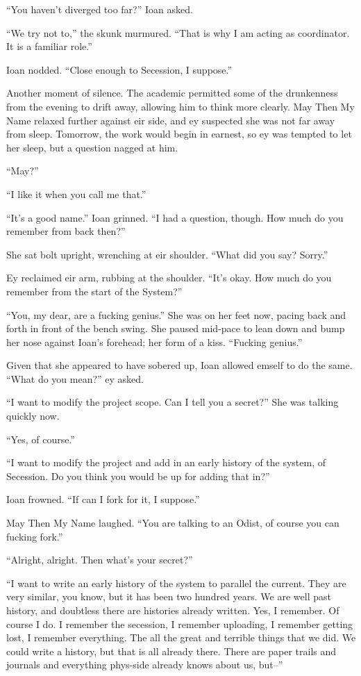 ``You haven't diverged too far?'' Ioan asked.

``We try not to,'' the skunk murmured. ``That is why I am acting as coordinator. It is a familiar role.''

Ioan nodded. ``Close enough to Secession, I suppose.''

Another moment of silence. The academic permitted some of the drunkenness from the evening to drift away, allowing him to think more clearly. May Then My Name relaxed further against eir side, and ey suspected she was not far away from sleep. Tomorrow, the work would begin in earnest, so ey was tempted to let her sleep, but a question nagged at him.

``May?''

``I like it when you call me that.''

``It's a good name.'' Ioan grinned. ``I had a question, though. How much do you remember from back then?''

She sat bolt upright, wrenching at eir shoulder. ``What did you say? Sorry.''

Ey reclaimed eir arm, rubbing at the shoulder. ``It's okay. How much do you remember from the start of the System?''

``You, my dear, are a fucking genius.'' She was on her feet now, pacing back and forth in front of the bench swing. She paused mid-pace to lean down and bump her nose against Ioan's forehead; her form of a kiss. ``Fucking genius.''

Given that she appeared to have sobered up, Ioan allowed emself to do the same. ``What do you mean?'' ey asked.

``I want to modify the project scope. Can I tell you a secret?'' She was talking quickly now.

``Yes, of course.''

``I want to modify the project and add in an early history of the system, of Secession. Do you think you would be up for adding that in?''

Ioan frowned. ``If can I fork for it, I suppose.''

May Then My Name laughed. ``You are talking to an Odist, of course you can fucking fork.''

``Alright, alright. Then what's your secret?''

``I want to write an early history of the system to parallel the current. They are very similar, you know, but it has been two hundred years. We are well past history, and doubtless there are histories already written. Yes, I remember. Of course I do. I remember the secession, I remember uploading, I remember getting lost, I remember everything. The all the great and terrible things that we did. We could write a history, but that is all already there. There are paper trails and journals and everything phys-side already knows about us, but--''

